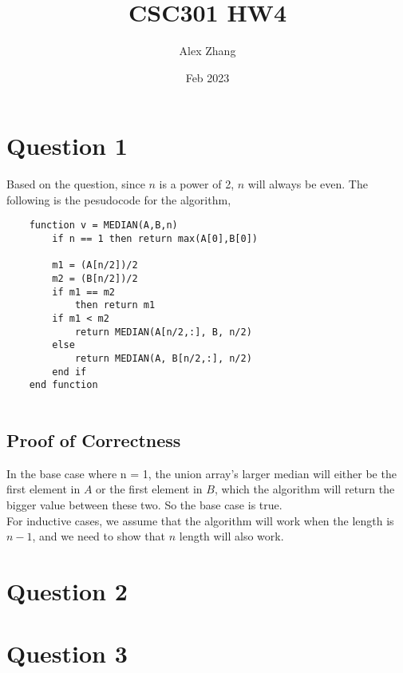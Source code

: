 \documentclass{article}
\title{CSC301 HW4}
\author{Alex Zhang}
\date{Feb 2023}
\begin{document}
\maketitle


\section*{Question 1}
Based on the question, since $n$ is a power of 2, $n$ will always be even. The following is the pesudocode for the algorithm,
\begin{verbatim}
    function v = MEDIAN(A,B,n)
        if n == 1 then return max(A[0],B[0])
        
        m1 = (A[n/2])/2
        m2 = (B[n/2])/2
        if m1 == m2 
            then return m1
        if m1 < m2
            return MEDIAN(A[n/2,:], B, n/2)
        else
            return MEDIAN(A, B[n/2,:], n/2)
        end if
    end function
        
\end{verbatim}
    \subsection*{Proof of Correctness}
    In the base case where n = 1, the union array's larger median will either be the first
    element in $A$ or the first element in $B$, which the algorithm will return the bigger
    value between these two. So the base case is true.
    \\
    For inductive cases, we assume that the algorithm will work when the length is $n-1$,
    and we need to show that $n$ length will also work.
    

\section*{Question 2}





\section*{Question 3}
\end{document}
